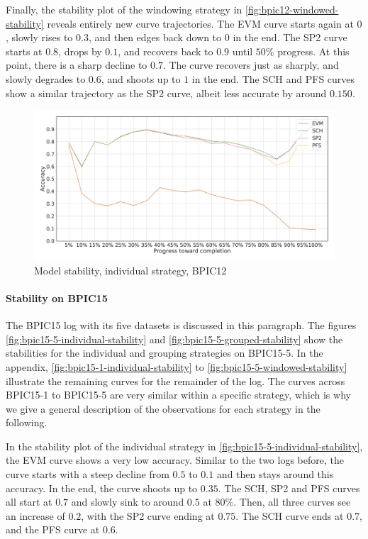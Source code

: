 Finally, the stability plot of the windowing strategy in \autoref{fig:bpic12-windowed-stability} reveals entirely new curve trajectories.
The EVM curve starts again at $0$, slowly rises to $0.3$, and then edges back down to $0$ in the end.
The SP2 curve starts at $0.8$, drops by $0.1$, and recovers back to $0.9$ until $50\%$ progress.
At this point, there is a sharp decline to $0.7$.
The curve recovers just as sharply, and slowly degrades to $0.6$, and shoots up to $1$ in the end.
The SCH and PFS curves show a similar trajectory as the SP2 curve, albeit less accurate by around $0.150$.

\begin{figure}[!htb]
    \centering
    \includegraphics[width=\textwidth]{gfx/bpic2012/individual_stability.pdf}
    \caption{Model stability, individual strategy, BPIC12}
    \label{fig:bpic12-individual-stability}
\end{figure}

\paragraph{Stability on BPIC15}
The BPIC15 log with its five datasets is discussed in this paragraph.
The figures \autoref{fig:bpic15-5-individual-stability} and \autoref{fig:bpic15-5-grouped-stability} show the stabilities for the individual and grouping strategies on BPIC15-5.
In the appendix, \autoref{fig:bpic15-1-individual-stability} to \autoref{fig:bpic15-5-windowed-stability} illustrate the remaining curves for the remainder of the log.
The curves across BPIC15-1 to BPIC15-5 are very similar within a specific strategy, which is why we give a general description of the observations for each strategy in the following.

In the stability plot of the individual strategy in \autoref{fig:bpic15-5-individual-stability}, the EVM curve shows a very low accuracy.
Similar to the two logs before, the curve starts with a steep decline from $0.5$ to $0.1$ and then stays around this accuracy. In the end, the curve shoots up to $0.35$.
The SCH, SP2 and PFS curves all start at $0.7$ and slowly sink to around $0.5$ at $80\%$.
Then, all three curves see an increase of $0.2$, with the SP2 curve ending at $0.75$.
The SCH curve ends at $0.7$, and the PFS curve at $0.6$.

